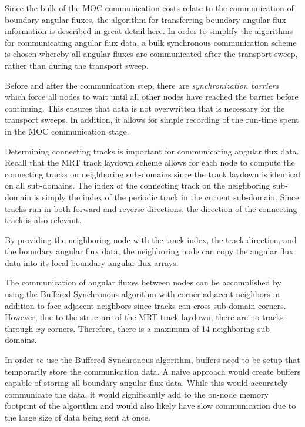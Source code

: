 Since the bulk of the \ac{MOC} communication costs relate to the communication of boundary angular fluxes, the algorithm for transferring boundary angular flux information is described in great detail here. In order to simplify the algorithms for communicating angular flux data, a bulk synchronous communication scheme is chosen whereby all angular fluxes are communicated after the transport sweep, rather than during the transport sweep. 

Before and after the communication step, there are \textit{synchronization barriers} which force all nodes to wait until all other nodes have reached the barrier before continuing. This ensures that data is not overwritten that is necessary for the transport sweeps. In addition, it allows for simple recording of the run-time spent in the \ac{MOC} communication stage.

Determining connecting tracks is important for communicating angular flux data. Recall that the \ac{MRT} track laydown scheme allows for each node to compute the connecting tracks on neighboring sub-domains since the track laydown is identical on all sub-domains. The index of the connecting track on the neighboring sub-domain is simply the index of the periodic track in the current sub-domain. Since tracks run in both forward and reverse directions, the direction of the connecting track is also relevant. 

By providing the neighboring node with the track index, the track direction, and the boundary angular flux data, the neighboring node can copy the angular flux data into its local boundary angular flux arrays. 

The communication of angular fluxes between nodes can be accomplished by using the Buffered Synchronous algorithm with corner-adjacent neighbors in addition to face-adjacent neighbors since tracks can cross sub-domain corners. However, due to the structure of the \ac{MRT} track laydown, there are no tracks through $xy$ corners. Therefore, there is a maximum of 14 neighboring sub-domains. 

In order to use the Buffered Synchronous algorithm, buffers need to be setup that temporarily store the communication data. A naive approach would create buffers capable of storing all boundary angular flux data. While this would accurately communicate the data, it would significantly add to the on-node memory footprint of the algorithm and would also likely have slow communication due to the large size of data being sent at once.

